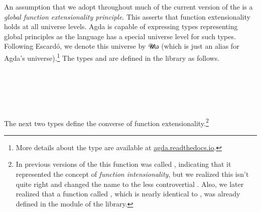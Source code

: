 An assumption that we adopt throughout much of the current version of the \ualib is a \emph{global function extensionality principle}. This asserts that function extensionality holds at all universe levels. Agda is capable of expressing types representing global principles as the language has a special universe level for such types.
Following Escardó, we denote this universe by 𝓤ω (which is just an alias for Agda's  universe).\footnote{More details about the  type are available at
\href{https://agda.readthedocs.io/en/latest/language/universe-levels.html\#expressions-of-kind-set}{agda.readthedocs.io}.}
The types  and  are defined in the \typetopology library as follows.
\ccpad
\begin{code}%
\>[1]\AgdaSpace{}%
\AgdaSymbol{:}\AgdaSpace{}%
\<%
\\
%
\>[1]\AgdaSpace{}%
\AgdaSymbol{=}\AgdaSpace{}%
%
\>[20]\AgdaSymbol{\{}\AgdaSpace{}%
\AgdaSymbol{\}}\AgdaSpace{}%
\AgdaSpace{}%
\AgdaSpace{}%
\AgdaSpace{}%
\<%
\\
%
\\[\AgdaEmptyExtraSkip]%
%
\>[1]\AgdaSpace{}%
\AgdaSymbol{:}\AgdaSpace{}%
\<%
\\
%
\>[1]\AgdaSpace{}%
\AgdaSymbol{=}\AgdaSpace{}%
\AgdaSpace{}%
\AgdaSymbol{\{}\AgdaSpace{}%
\AgdaSymbol{\}}\AgdaSpace{}%
\AgdaSpace{}%
\AgdaSpace{}%
\AgdaSpace{}%
\<%
\end{code}
\ccpad
The next two types define the converse of function extensionality.\footnote{In previous versions of the
\ualib this function was called , indicating that it represented the concept of \emph{function intensionality}, but we realized this isn't quite right and changed the name to the less controvertial .  Also, we later realized that a function called , which is nearly identical to , was already defined in the  module of the \typetopology library.}
\ccpad
